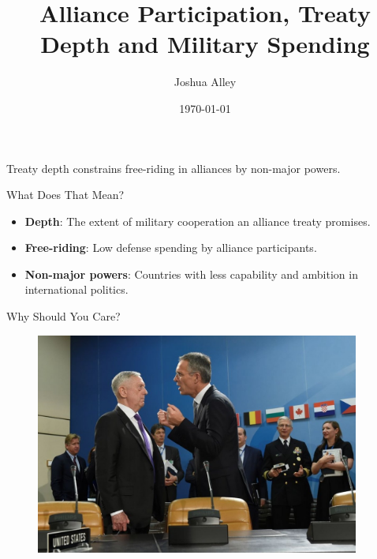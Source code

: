 \documentclass[12pt]{beamer}
\title{Alliance Participation, Treaty Depth and Military Spending}
\date{\today}
\author{Joshua Alley}
\institute{Texas A\&M University}
\begin{document}
 \maketitle




 \begin{frame}[standout]

Treaty depth constrains free-riding in alliances by non-major powers.  

 \end{frame}
 
 
 \begin{frame}{What Does That Mean?} 

\begin{itemize}
\item \textbf{Depth}: The extent of military cooperation an alliance treaty promises.
\pause  
\item \textbf{Free-riding}: Low defense spending by alliance participants. 
\pause 
\item \textbf{Non-major powers}: Countries with less capability and ambition in international politics. 
\end{itemize}

 \end{frame}




\begin{frame}{Why Should You Care?}

\begin{figure}[htbp]
	\centering
		\includegraphics[width=0.95\textwidth]{mattis-nato.jpg}
	\label{fig:mattis-nato}
\end{figure}


\end{frame}
\end{document}

